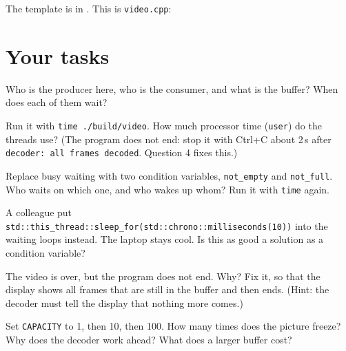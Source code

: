 The template is in . This is \texttt{video.cpp}:


\runline

\section{Your tasks}

\begin{questions}
  \setcounter{questionsi}{-1}
  \item Who is the producer here, who is the consumer, and what is the buffer? When does each of them wait?
  \item Run it with \texttt{time ./build/video}. How much processor time (\texttt{user}) do the threads use?
        (The program does not end: stop it with Ctrl+C about 2\,s after \texttt{decoder: all frames decoded}.
        Question 4 fixes this.)
  \item Replace busy waiting with two condition variables, \texttt{not\_empty} and \texttt{not\_full}.
        Who waits on which one, and who wakes up whom? Run it with \texttt{time} again.
  \item A colleague put \texttt{std::this\_thread::sleep\_for(std::chrono::milliseconds(10))} into the waiting
        loops instead. The laptop stays cool. Is this as good a solution as a condition variable?
  \item The video is over, but the program does not end. Why? Fix it, so that the display shows all frames that
        are still in the buffer and then ends. (Hint: the decoder must tell the display that nothing more comes.)
  \item Set \texttt{CAPACITY} to 1, then 10, then 100. How many times does the picture freeze?
        Why does the decoder work ahead? What does a larger buffer cost?
\end{questions}
